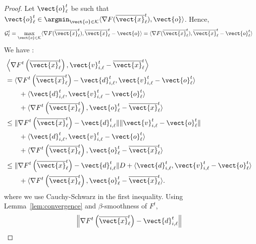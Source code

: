 \begin{proof}
Let $\vect{o}^t_{\ell}$ be such that 
$
        \vect{o}^t_{\ell} \in \argmin_{\vect{o} \in \mathcal{K}}\langle \nabla F(\overline{\vect{x}}^t_{\ell}),\vect{o} \rangle
$. Hence, 
    \begin{align*}
     \mathcal{G}^t_{\ell} 
     = \max_{\vect{o} \in \mathcal{K}}\langle \nabla F(\overline{\vect{x}}^t_{\ell}), \overline{\vect{x}}^t_{\ell} - \vect{o}\rangle 
     = \langle \nabla F(\overline{\vect{x}}^t_{\ell}), \overline{\vect{x}}^t_{\ell} - \vect{o}^t_{\ell}\rangle
    \end{align*} 
%
We have :
    \begin{align*}
        &\left \langle \nabla F^{t} \left( \overline{\vect{x}}^t_{\ell} \right) , \vect{v}^t_{i,\ell} - \overline{\vect{x}}^t_{\ell} \right \rangle \\
        & =\langle \nabla F^{t} \left( \overline{\vect{x}}^t_{\ell} \right) - \vect{d}^t_{i,\ell}, \vect{v}^t_{i,\ell} - \vect{o}^t_{\ell} \rangle \\
         	& \qquad + \langle \vect{d}^t_{i,\ell}, \vect{v}^t_{i,\ell} - \vect{o}^t_{\ell} \rangle \\
         	& \qquad + \langle \nabla F^{t} \left( \overline{\vect{x}}^t_{\ell} \right), \vect{o}^t_{\ell} - \overline{\vect{x}}^t_{\ell} \rangle \\
        &\leq \|\nabla F^{t} \left(\overline{\vect{x}}^t_{\ell} \right) - \vect{d}^t_{i, \ell} \| \|\vect{v}^t_{i,\ell} - \vect{o}^t_{\ell}\| \\
        		 & \qquad + \langle \vect{d}^t_{i,\ell}, \vect{v}^t_{i,\ell} - \vect{o}^t_{\ell} \rangle \\
         	& \qquad + \langle \nabla F^{t} \left( \overline{\vect{x}}^t_{\ell} \right), \vect{o}^t_{\ell} - \overline{\vect{x}}^t_{\ell} \rangle \\
         & \leq \|\nabla F^{t} \left(\overline{\vect{x}}^t_{\ell} \right) - \vect{d}^t_{i, \ell} \|D + \langle \vect{d}^t_{i,\ell}, \vect{v}^t_{i,\ell} - \vect{o}^t_{\ell} \rangle \\
         	& \qquad+ \langle \nabla F^{t} \left( \overline{\vect{x}}^t_{\ell} \right), \vect{o}^t_{\ell} - \overline{\vect{x}}^t_{\ell} \rangle. 
    \end{align*}
where we use Cauchy-Schwarz in the first inequality.  
Using Lemma~\ref{lem:convergence} and $\beta$-smoothness of $F^t$,
%
    \begin{align*}
        &\left\| \nabla F^{t} \left(\overline{\vect{x}}^t_{\ell} \right) - \vect{d}^t_{i, \ell} \right\| \\

\end{align*}
\end{proof}
